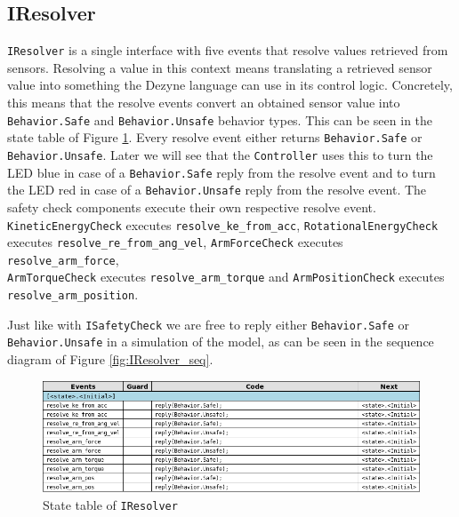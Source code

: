 \documentclass[12pt]{scrreprt}
\begin{document}
\begin{appendices}
\subsection{IResolver}
\texttt{IResolver} is a single interface with five events that resolve values retrieved from sensors. Resolving a value in this context means translating a retrieved sensor value into something the Dezyne language can use in its control logic. Concretely, this means that the resolve events convert an obtained sensor value into \texttt{Behavior.Safe} and \texttt{Behavior.Unsafe} behavior types. This can be seen in the state table of Figure \ref{fig:IResolver_state_table}. Every resolve event either returns \texttt{Behavior.Safe} or \texttt{Behavior.Unsafe}. Later we will see that the \texttt{Controller} uses this to turn the LED blue in case of a \texttt{Behavior.Safe} reply from the resolve event and to turn the LED red in case of a \texttt{Behavior.Unsafe} reply from the resolve event. The safety check components execute their own respective resolve event. \texttt{KineticEnergyCheck} executes \texttt{resolve\_ke\_from\_acc}, \texttt{RotationalEnergyCheck} executes \texttt{resolve\_re\_from\_ang\_vel}, \texttt{ArmForceCheck} executes \texttt{resolve\_arm\_force},\\\texttt{ArmTorqueCheck} executes \texttt{resolve\_arm\_torque} and \texttt{ArmPositionCheck} executes\\\texttt{resolve\_arm\_position}.
\par
Just like with \texttt{ISafetyCheck} we are free to reply either \texttt{Behavior.Safe} or\\ \texttt{Behavior.Unsafe} in a simulation of the model, as can be seen in the sequence diagram of Figure \ref{fig:IResolver_seq}.

\begin{figure}[H]
    \centering
    \includegraphics[width=\textwidth]{Figures/results/modelling_figures/IResolver/IResolver_state_table.png}
    \caption{State table of \texttt{IResolver}}
    \label{fig:IResolver_state_table}
\end{figure}


\end{appendices}
\end{document}
